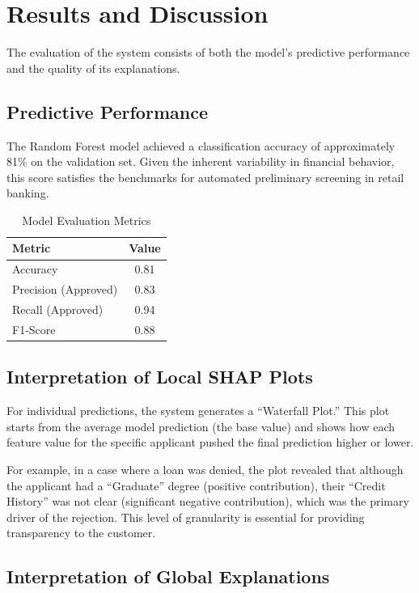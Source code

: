 \documentclass[12pt, a4paper]{article}
\begin{document}
\section{Results and Discussion}

The evaluation of the system consists of both the model's predictive performance and the quality of its explanations.

\subsection{Predictive Performance}

The Random Forest model achieved a classification accuracy of approximately 81\% on the validation set. Given the inherent variability in financial behavior, this score satisfies the benchmarks for automated preliminary screening in retail banking.

\begin{table}[h]
\centering
\caption{Model Evaluation Metrics}
\begin{tabular}{@{}lc@{}}
\toprule
Metric & Value \\ \midrule
Accuracy & 0.81 \\
Precision (Approved) & 0.83 \\
Recall (Approved) & 0.94 \\
F1-Score & 0.88 \\ \bottomrule
\end{tabular}
\end{table}

\subsection{Interpretation of Local SHAP Plots}

For individual predictions, the system generates a ``Waterfall Plot.'' This plot starts from the average model prediction (the base value) and shows how each feature value for the specific applicant pushed the final prediction higher or lower.

For example, in a case where a loan was denied, the plot revealed that although the applicant had a ``Graduate'' degree (positive contribution), their ``Credit History'' was not clear (significant negative contribution), which was the primary driver of the rejection. This level of granularity is essential for providing transparency to the customer.

\subsection{Interpretation of Global Explanations}
\end{document}
